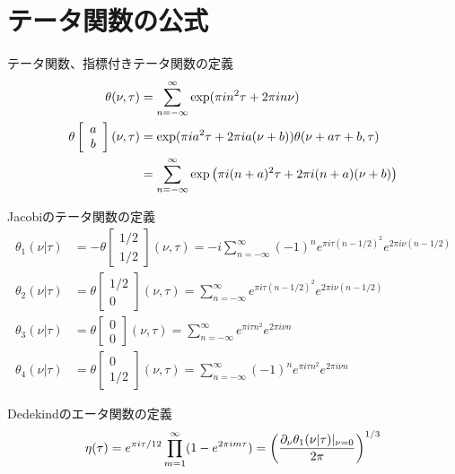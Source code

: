 \chapter{テータ関数の公式}
テータ関数、指標付きテータ関数の定義
\begin{align}
\theta(\nu,\tau)&=\sum_{n=-\infty}^{\infty} \exp(\pi i n^2 \tau + 2\pi i n \nu)\\
\theta\left[\begin{array}{c}
a\\
b\end{array}\right](\nu,\tau)&=\exp(\pi i a^2 \tau + 2\pi i a (\nu+b))\theta(\nu+a\tau+b,\tau)\notag\\
&=\sum_{n=-\infty}^{\infty}\exp\left(\pi i (n+a)^2\tau + 2\pi i (n+a)(\nu+b) \right)
\end{align}

Jacobiのテータ関数の定義
\begin{align}
\theta_1(\nu|\tau)&=-\theta\left[\begin{array}{c}
1/2\\
1/2\end{array}\right](\nu,\tau)=-i\sum_{n=-\infty}^\infty (-1)^n e^{\pi i \tau (n-1/2)^2}e^{2\pi i \nu(n-1/2)} \\
\theta_2(\nu|\tau)&=\theta\left[\begin{array}{c}
1/2\\
0\end{array}\right](\nu,\tau)=\sum_{n=-\infty}^{\infty} e^{\pi i \tau(n-1/2)^2}e^{2\pi i \nu (n-1/2)}\\
\theta_3(\nu|\tau)&=\theta\left[\begin{array}{c}
0\\
0\end{array}\right](\nu,\tau)=\sum_{n=-\infty}^{\infty} e^{\pi i \tau n^2}e^{2\pi i \nu n}\\
\theta_4(\nu|\tau)&=\theta\left[\begin{array}{c}
0\\
1/2\end{array}\right](\nu,\tau)=\sum_{n=-\infty}^{\infty} (-1)^n e^{\pi i \tau n^2}e^{2\pi i \nu n}
\end{align}

Dedekindのエータ関数の定義
\begin{align}
\eta(\tau)=e^{\pi i \tau/12}\prod_{m=1}^\infty (1-e^{2\pi i m\tau})=\left(\frac{\partial_\nu \theta_1(\nu|\tau)|_{\nu=0}}{2\pi}\right)^{1/3}
\end{align}

